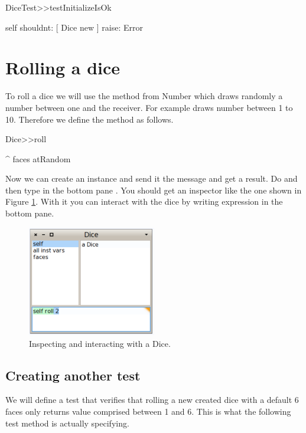 \documentclass[a4paper,10pt,twoside]{book}
\begin{document}
\begin{code}{}
DiceTest>>testInitializeIsOk

		self shouldnt: [ Dice new ] raise: Error
\end{code}

\section{ Rolling a dice}
To roll a dice we will use the method from Number  which draws randomly a 
number between one and the receiver. For example  draws number between 1 to 10. 
Therefore we define the method  as follows.


\begin{code}{}
Dice>>roll

	^ faces atRandom
\end{code}


Now we can create an instance  and send it the message   and get a result.
Do  and then type in the bottom pane .
You should get an inspector like the one shown in Figure \ref{figDiceNoDetail}. With it you can interact with the dice by writing expression in the bottom pane.


\begin{figure}

\begin{center}
\includegraphics[width=0.5\textwidth]{figures/DiceNoDetail.pdf}\caption{Inspecting and interacting with a Dice.\label{figDiceNoDetail}}\end{center}
\end{figure}


 
\subsection{ Creating another test}
We will define a test that verifies that rolling a new created dice with a default 6 faces only returns 
value comprised between 1 and 6. This is what the following test method is actually specifying.
 
\end{document}
